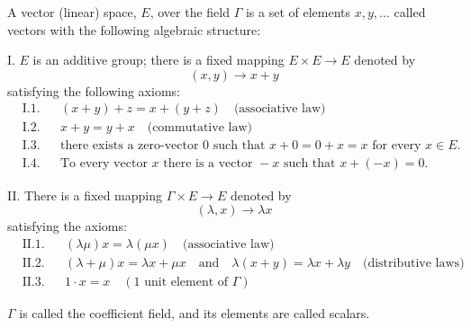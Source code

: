 A vector (linear) space, $E$, over the field $\Gamma$ is a set of elements $x, y, \ldots$ called vectors with the following algebraic structure:

I. $E$ is an additive group; there is a fixed mapping $E \times E \to E$ denoted by
$$(x, y) \to x + y$$
satisfying the following axioms:
\begin{align}
&\text{I.1.} && (x + y) + z = x + (y + z) \quad \text{(associative law)} \\
&\text{I.2.} && x + y = y + x \quad \text{(commutative law)} \\
&\text{I.3.} && \text{there exists a zero-vector } 0 \text{ such that } x + 0 = 0 + x = x \text{ for every } x \in E. \\
&\text{I.4.} && \text{To every vector } x \text{ there is a vector } -x \text{ such that } x + (-x) = 0.
\end{align}

II. There is a fixed mapping $\Gamma \times E \to E$ denoted by
$$(\lambda, x) \to \lambda x$$
satisfying the axioms:
\begin{align}
&\text{II.1.} && (\lambda \mu)x = \lambda (\mu x) \quad \text{(associative law)} \\
&\text{II.2.} && (\lambda + \mu)x = \lambda x + \mu x \quad \text{and} \quad \lambda(x + y) = \lambda x + \lambda y \quad \text{(distributive laws)} \\
&\text{II.3.} && 1 \cdot x = x \quad (1 \text{ unit element of } \Gamma)
\end{align}

$\Gamma$ is called the coefficient field, and its elements are called scalars.
